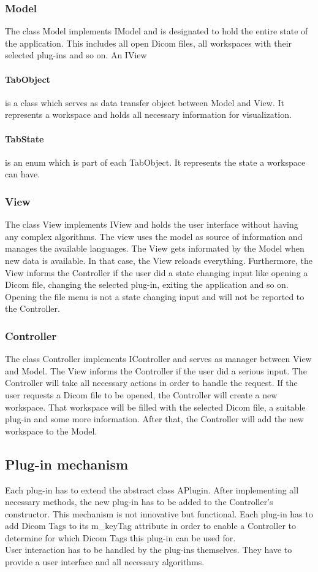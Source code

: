 \subsubsection{Model}
The class Model implements IModel and is designated to hold the entire state of the application. This includes all open Dicom files, all workspaces with their selected plug-ins and so on. An IView
\paragraph{TabObject} is a class which serves as data transfer object between Model and View. It represents a workspace and holds all necessary information for visualization.
\paragraph{TabState} is an enum which is part of each TabObject. It represents the state a workspace can have.

\subsubsection{View}
The class View implements IView and holds the user interface without having any complex algorithms. The view uses the model as source of information and manages the available languages. The View gets informated by the Model when new data is available. In that case, the View reloads everything. Furthermore, the View informs the Controller if the user did a state changing input like opening a Dicom file, changing the selected plug-in, exiting the application and so on. Opening the file menu is not a state changing input and will not be reported to the Controller.

\subsubsection{Controller}
The class Controller implements IController and serves as manager between View and Model. The View informs the Controller if the user did a serious input. The Controller will take all necessary actions in order to handle the request. If the user requests a Dicom file to be opened, the Controller will create a new workspace. That workspace will be filled with the selected Dicom file, a suitable plug-in and some more information. After that, the Controller will add the new workspace to the Model.

\subsection{Plug-in mechanism}
Each plug-in has to extend the abstract class APlugin. After implementing all necessary methods, the new plug-in has to be added to the Controller's constructor. This mechanism is not innovative but functional. Each plug-in has to add Dicom Tags to its m\_keyTag attribute in order to enable a Controller to determine for which Dicom Tags this plug-in can be used for.\\
User interaction has to be handled by the plug-ins themselves. They have to provide a user interface and all necessary algorithms. 
